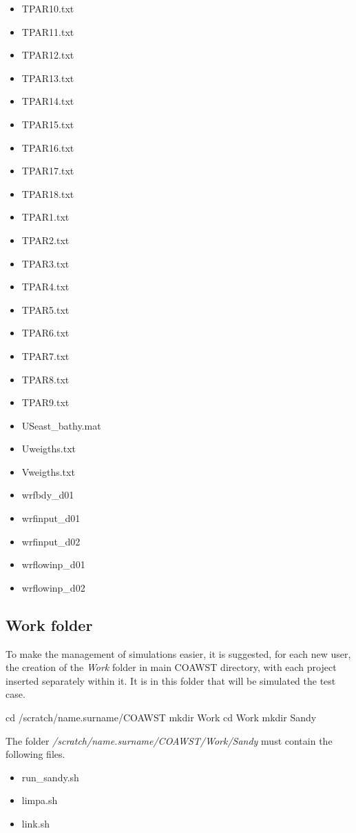 \begin{itemize}
\item TPAR10.txt
\item TPAR11.txt
\item TPAR12.txt
\item TPAR13.txt
\item TPAR14.txt
\item TPAR15.txt
\item TPAR16.txt
\item TPAR17.txt
\item TPAR18.txt
\item TPAR1.txt
\item TPAR2.txt
\item TPAR3.txt
\item TPAR4.txt
\item TPAR5.txt
\item TPAR6.txt
\item TPAR7.txt
\item TPAR8.txt
\item TPAR9.txt
\item USeast\_bathy.mat
\item Uweigths.txt
\item Vweigths.txt
\item wrfbdy\_d01
\item wrfinput\_d01
\item wrfinput\_d02
\item wrflowinp\_d01
\item wrflowinp\_d02
\end{itemize}
\bigskip

\subsection{Work folder}\label{workcoawstsec}
\bigskip

\noindent To make the management of simulations easier, it is suggested, for each new user, the creation of the \textit{Work} folder in
main COAWST directory, with each project inserted separately within it. It is in this folder that will be simulated
the test case.
\bigskip

\begin{bashcode}
cd /scratch/name.surname/COAWST
mkdir Work
cd Work
mkdir Sandy
\end{bashcode}
\bigskip

\noindent The folder \textit{/scratch/name.surname/COAWST/Work/Sandy} must contain the following files.
\bigskip

\begin{itemize}
\item run\_sandy.sh
\item limpa.sh
\item link.sh
\end{itemize}
\bigskip

